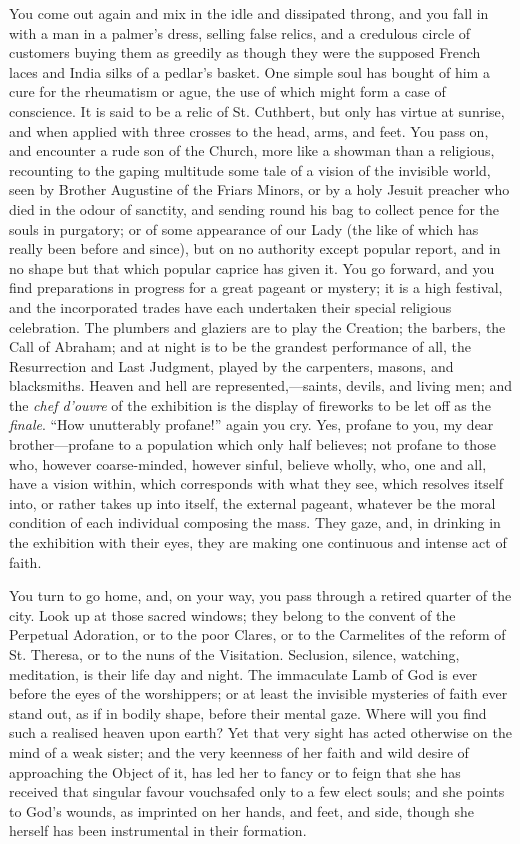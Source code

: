 You come out again and mix in the idle and dissipated throng, and
you fall in with a man in a palmer's dress, selling false relics, and
a credulous circle of customers buying them as greedily as though they
were the supposed French laces and India silks of a pedlar's basket.
One simple soul has bought of him a cure for the rheumatism or ague,
the use of which might form a case of conscience. It is said to be a
relic of St. Cuthbert, but only has virtue at sunrise, and when applied
with three crosses to the head, arms, and feet. You pass on, and
encounter a rude son of the Church, more like a showman than a
religious, recounting to the gaping multitude some tale of a vision of
the invisible world, seen by Brother Augustine of the Friars Minors,
or by a holy Jesuit preacher who died in the odour of sanctity, and
sending round his bag to collect pence for the souls in purgatory; or
of some appearance of our Lady (the like of which has really been
before and since), but on no authority except popular report, and in
no shape but that which popular caprice has given it. You go forward,
and you find preparations in progress for a great pageant or mystery;
it is a high festival, and the incorporated trades have each
undertaken their special religious celebration. The plumbers and
glaziers are to play the Creation; the barbers, the Call of Abraham;
and at night is to be the grandest performance of all, the
Resurrection and Last Judgment, played by the carpenters, masons, and
blacksmiths. Heaven and hell are represented,—saints, devils, and
living men; and the \emph{chef d'ouvre} of the exhibition is the
display of fireworks to be let off as the \emph{finale}. ``How
unutterably profane!'' again you cry. Yes, profane to you, my dear
brother—profane to a population which only half believes; not profane
to those who, however coarse-minded, however sinful, believe wholly,
who, one and all, have a vision within, which corresponds with what
they see, which resolves itself into, or rather takes up into itself,
the external pageant, whatever be the moral condition of each
individual composing the mass. They gaze, and, in drinking in the
exhibition with their eyes, they are making one continuous and intense
act of faith.

You turn to go home, and, on your way, you pass through a retired
quarter of the city. Look up at those sacred windows; they belong to
the convent of the Perpetual Adoration, or to the poor Clares, or to
the Carmelites of the reform of St. Theresa, or to the nuns of the
Visitation. Seclusion, silence, watching, meditation, is their life
day and night. The immaculate Lamb of God is ever before the eyes of
the worshippers; or at least the invisible mysteries of faith ever
stand out, as if in bodily shape, before their mental gaze. Where will
you find such a realised heaven upon earth? Yet that very sight has
acted otherwise on the mind of a weak sister; and the very keenness of
her faith and wild desire of approaching the Object of it, has led her
to fancy or to feign that she has received that singular favour
vouchsafed only to a few elect souls; and she points to God's wounds,
as imprinted on her hands, and feet, and side, though she herself has
been instrumental in their formation.

